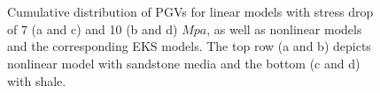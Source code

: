 \clearpage
{}
\begin{figure}[!ht]
     \hfil%
     \\[\baselineskip]%
     \hfil%
     \\[\baselineskip]

    \caption{Cumulative distribution of PGVs for linear models with stress drop of 7 (a and c) and 10 (b and d) $Mpa$, as well as nonlinear models and the corresponding EKS models. The top row (a and b) depicts nonlinear model with sandstone media and the bottom (c and d) with shale.}
    \label{fig:eks-5}
\end{figure}

